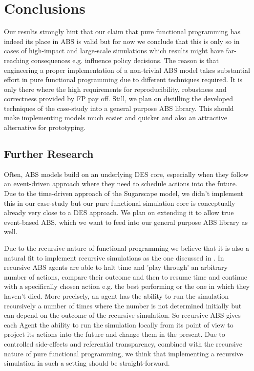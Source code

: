 \section{Conclusions}
\label{sec:conclusions}
Our results strongly hint that our claim that pure functional programming has indeed its place in ABS is valid but for now we conclude that this is only so in cases of high-impact and large-scale simulations which results might have far-reaching consequences e.g. influence policy decisions. The reason is that engineering a proper implementation of a non-trivial ABS model takes substantial effort in pure functional programming due to different techniques required. It is only there where the high requirements for reproducibility, robustness and correctness provided by FP pay off. Still, we plan on distilling the developed techniques of the case-study into a general purpose ABS library. This should make implementing models much easier and quicker and also an attractive alternative for prototyping.

\subsection{Further Research}
Often, ABS models build on an underlying DES core, especially when they follow an event-driven approach \cite{meyer_event-driven_2014} where they need to schedule actions into the future. Due to the time-driven approach of the Sugarscape model, we didn't implement this in our case-study but our pure functional simulation core is conceptually already very close to a DES approach. We plan on extending it to allow true event-based ABS, which we want to feed into our general purpose ABS library as well.

Due to the recursive nature of functional programming we believe that it is also a natural fit to implement recursive simulations as the one discussed in \cite{gilmer_recursive_2000}. In recursive ABS agents are able to halt time and 'play through' an arbitrary number of actions, compare their outcome and then to resume time and continue with a specifically chosen action e.g. the best performing or the one in which they haven't died. More precisely, an agent has the ability to run the simulation recursively a number of times where the number is not determined initially but can depend on the outcome of the recursive simulation. So recursive ABS gives each Agent the ability to run the simulation locally from its point of view to project its actions into the future and change them in the present. Due to controlled side-effects and referential transparency, combined with the recursive nature of pure functional programming, we think that implementing a recursive simulation in such a setting should be straight-forward.

